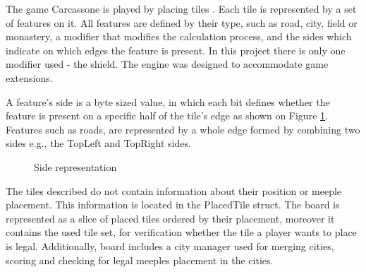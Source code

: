 The game Carcassone is played by placing tiles \cite{CarcassoneRules}. Each tile is represented by a set of features on it. All features are defined by their type, such as road, city, field or monastery, a modifier that modifies the calculation process, and the sides which indicate on which edges the feature is present. In this project there is only one modifier used - the shield. The engine was designed to accommodate game extensions. 

A feature's side is a byte sized value, in which each bit defines whether the feature is present on a specific half of the tile's edge as shown on Figure \ref{fig:SIDES}. Features such as roads, are represented by a whole edge formed by combining two sides e.g., the TopLeft and TopRight sides.
\begin{figure}
    \centering
    \caption{Side representation} \label{fig:SIDES}
\end{figure}

The tiles described do not contain information about their position or meeple placement. This information is located in the PlacedTile struct. The board is represented as a slice of placed tiles ordered by their placement, moreover it contains the used tile set, for verification whether the tile a player wants to place is legal. Additionally, board includes a city manager used for merging cities, scoring and checking for legal meeples placement in the cities.

